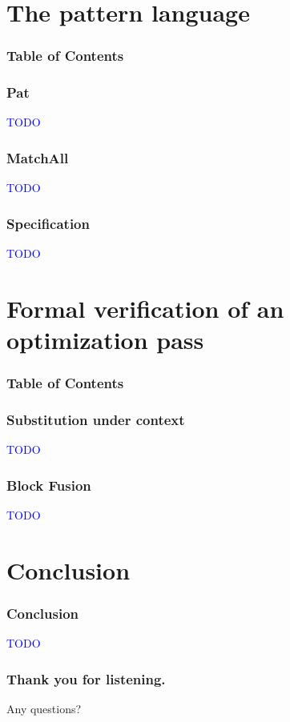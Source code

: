 \documentclass{beamer}
\newcommand{\leon}[1]{\textcolor{blue}{#1}}
\begin{document}
\section{The pattern language}

\begin{frame}
  \frametitle{Table of Contents}
  \tableofcontents
\end{frame}

\begin{frame}
  \frametitle{Pat}
  \leon{TODO}
\end{frame}

\begin{frame}
  \frametitle{MatchAll}
  \leon{TODO}
\end{frame}

\begin{frame}
  \frametitle{Specification}
  \leon{TODO}
\end{frame}

\section{Formal verification of an optimization pass}

\begin{frame}
  \frametitle{Table of Contents}
  \tableofcontents[currentsection]
\end{frame}

\begin{frame}
  \frametitle{Substitution under context}
  \leon{TODO}
\end{frame}

\begin{frame}
  \frametitle{Block Fusion}
  \leon{TODO}
\end{frame}

\section*{Conclusion}

\begin{frame}
  \frametitle{Conclusion}
  \leon{TODO}
\end{frame}

\begin{frame}
  \frametitle{Thank you for listening.}
  Any questions?
\end{frame}
\end{document}
